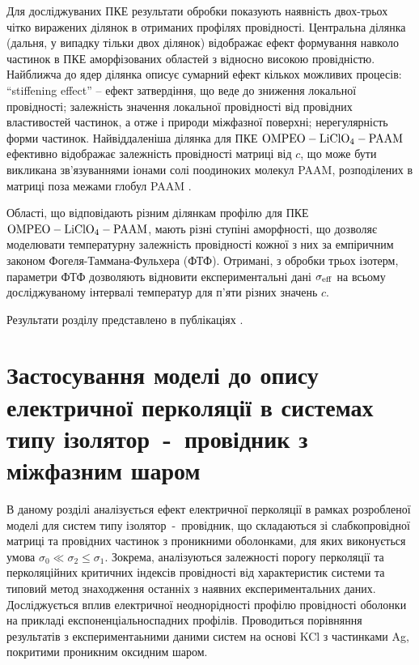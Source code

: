 \documentclass[14pt,twoside]{vakthesis}
\begin{document}
Для досліджуваних ПКЕ результати обробки показують наявність двох-трьох чітко виражених ділянок в отриманих профілях провідності. Центральна ділянка (дальня, у випадку тільки двох ділянок) відображає ефект формування навколо частинок в ПКЕ аморфізованих областей з відносно високою провідністю. 
Найближча до ядер ділянка описує сумарний ефект кількох можливих процесів: ``stiffening effect'' -- ефект затвердіння, що веде до зниження локальної провідності; залежність значення локальної провідності від провідних властивостей частинок, а отже і природи міжфазної поверхні; нерегулярність форми частинок.
Найвіддаленіша ділянка для ПКЕ $\rm OMPEO-LiClO_4-PAAM$ ефективно відображає залежність провідності матриці від $c$, що може бути викликана зв'язуваннями іонами солі поодиноких молекул PAAM, розподілених в матриці поза межами глобул PAAM \cite{Wiec1994}.

Області, що відповідають різним ділянкам профілю для ПКЕ $\rm OMPEO-LiClO_4-PAAM$, мають різні ступіні аморфності, що дозволяє моделювати температурну залежність провідності кожної з них за емпіричним законом Фогеля-Таммана-Фульхера (ФТФ). Отримані, з обробки трьох ізотерм, параметри ФТФ дозволяють відновити експериментальні дані $\sigma_{\rm eff}$ на всьому досліджуваному інтервалі температур для п'яти різних значень $c$.

Результати розділу представлено в публікаціях \cite{Sushko2018JML, Sushko2018PRE}.


\chapter{Застосування моделі до опису електричної перколяції в системах типу ізо\-лятор~-~провідник з міжфазним шаром}\label{sec:simple-composites}

В даному розділі аналізується ефект електричної перколяції в рамках розробленої моделі для  систем типу ізолятор~-~провідник, що складаються зі слабкопровідної матриці та провідних частинок з проникними оболонками, для яких виконується умова $\sigma_0 \ll \sigma_2 \leq \sigma_1$. Зокрема, аналізуються залежності порогу перколяції та перколяційних критичних індексів провідності від характеристик системи та типовий метод знаходження останніх з наявних експериментальних даних. Досліджується вплив електричної неоднорідності профілю провідності оболонки на прикладі експоненціальноспадних профілів. Проводиться порівняння результатів з експериментаьними даними систем на основі KCl з частинками Ag, покритими проникним оксидним шаром.
\end{document}
